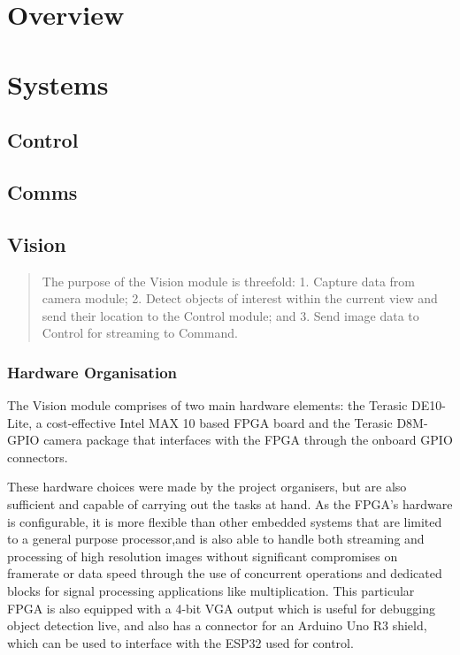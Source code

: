 \documentclass[a4paper]{article}
\begin{document}
\newpage

\section{Overview}

\section{Systems}

\subsection{Control}
\subsection{Comms}

\subsection{Vision}
\begin{abstract}
    The purpose of the Vision module is threefold:
    1. Capture data from camera module;
    2. Detect objects of interest within the current view and 
        send their location to the Control module; and
    3. Send image data to Control for streaming to Command. 
\end{abstract}

\subsubsection{Hardware Organisation}

The Vision module comprises of two main hardware elements: 
    the Terasic DE10-Lite, a cost-effective Intel MAX 10 based FPGA board 
    \cite{TerasicDE10Web} 
    and the Terasic D8M-GPIO camera package \cite{TerasicD8MWeb}
that interfaces with the FPGA through the onboard GPIO connectors. 

These hardware choices were made by the project organisers, 
but are also sufficient and capable of carrying out the tasks at hand. 
As the FPGA's hardware is configurable, 
it is more flexible than other embedded systems 
that are limited to a general purpose processor,and 
is also able to handle both streaming and processing of high resolution images
without significant compromises on framerate or data speed 
through the use of concurrent operations and dedicated blocks 
for signal processing applications like multiplication.
This particular FPGA is also equipped with a 4-bit VGA output 
which is useful for debugging object detection live, 
and also has a connector for an Arduino Uno R3 shield, \cite{TerasicDE10Web} 
which can be used to interface with the ESP32 used for control.  
\end{document}

